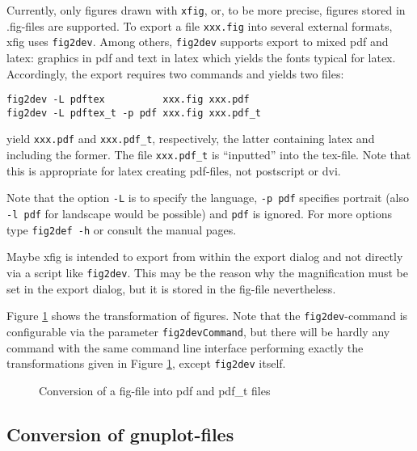 \documentclass[12pt]{article}
\begin{document}
Currently, only figures drawn with {\tt xfig}, or, to be more precise, 
figures stored in .fig-files are supported. 
To export a file {\tt xxx.fig} into several external formats, 
xfig uses {\tt fig2dev}. 
Among others, {\tt fig2dev} supports export to mixed pdf and latex: 
graphics in pdf and text in latex which yields the fonts typical for latex. 
Accordingly, the export requires two commands and yields two files: 
%
\begin{verbatim}
fig2dev -L pdftex          xxx.fig xxx.pdf   
fig2dev -L pdftex_t -p pdf xxx.fig xxx.pdf_t
\end{verbatim}
%
yield {\tt xxx.pdf} and {\tt xxx.pdf\_t}, respectively, 
the latter containing latex and including the former. 
The file {\tt xxx.pdf\_t} is ``inputted'' into the tex-file. 
Note that this is appropriate for latex creating pdf-files, 
not postscript or dvi. 

Note that the option {\tt -L} is to specify the language, 
{\tt -p pdf} specifies portrait 
(also {\tt -l pdf} for landscape would be possible) 
and {\tt pdf} is ignored. 
For more options type {\tt fig2def -h} or consult the manual pages. 

Maybe xfig is intended to export from within the export dialog 
and not directly via a script like {\tt fig2dev}. 
This may be the reason 
why the magnification must be set in the export dialog, 
but it is stored in the fig-file nevertheless. 

Figure \ref{fig:fig2dev} shows the transformation of figures. 
Note that the {\tt fig2dev}-command is configurable 
via the parameter {\tt fig2devCommand}, 
but there will be hardly any command with the same command line interface 
performing exactly the transformations given in Figure \ref{fig:fig2dev}, 
except {\tt fig2dev} itself. 

\begin{figure}[htb]
\begin{center}

\end{center}
\caption{\label{fig:fig2dev}Conversion of a fig-file into pdf and pdf\_t files}
\end{figure}

\subsection{Conversion of gnuplot-files}\label{subsec:gnuplot2pdf}
\end{document}
